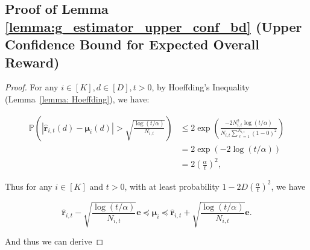 \subsection{Proof of Lemma \ref{lemma:g_estimator_upper_conf_bd} (Upper Confidence Bound for Expected Overall Reward)}
\label{sec:app_pf_lemma_g_estimator_upper_conf_bd}

\begin{proof}

For any $i \in [K], d \in [D], t>0$, by Hoeffding’s Inequality (Lemma~\ref{lemma: Hoeffding}), we have:

\begin{equation}
\begin{aligned}
\mathbb{P} \left( | \hat{\boldsymbol{r}}_{i,t}(d) - \boldsymbol{\mu}_{i}(d) | > \sqrt{\frac{ \log(t/\alpha)}{N_{i,t}}} \right)
& \leq
2\exp \left( \frac{-2 N_{i,t}^2 \log(t/\alpha) }{ N_{i,t} \sum_{\ell=1}^{N_{i,t}}(1-0)^2 } \right) \\
& =
2\exp \left( -2 \log(t/\alpha) \right) \\
& =
2 \left( \frac{\alpha}{t} \right)^2,
\end{aligned}
\end{equation}

Thus for any $i \in [K] $ and $t > 0$, with at least probability $1 - 2D \left( \frac{\alpha}{t} \right)^2$, we have 

\[
\boldsymbol{\hat{r}}_{i,t} - \sqrt{\frac{ \log(t/\alpha)}{N_{i,t}}} \boldsymbol{e} \preceq \boldsymbol{\mu}_{i} \preceq \boldsymbol{\hat{r}}_{i,t} + \sqrt{\frac{ \log(t/\alpha)}{N_{i,t}}} \boldsymbol{e}.
\]

And thus we can derive 


\end{proof}
